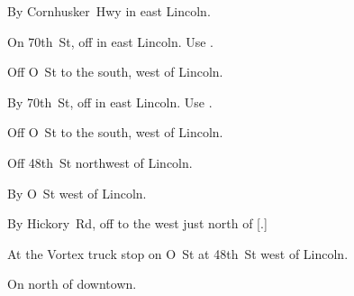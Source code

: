 
\begin{LocationList}

By  Cornhusker~Hwy in east Lincoln.

On 70th~St, off  in east Lincoln.
Use  .

\Location{\GarageHQ \Garage}
Off  O~St to the south, west of Lincoln.

By 70th~St, off  in east Lincoln.
Use  .

Off  O~St to the south, west of Lincoln.

Off  48th~St northwest of Lincoln.

\Location{\RecruitmentAgency \Recruitment}
By  O~St west of Lincoln.

By Hickory~Rd, off  to the west just north of [.]

At the Vortex truck stop on  O~St at  48th~St west of Lincoln.

On  north of downtown.

\end{LocationList}
